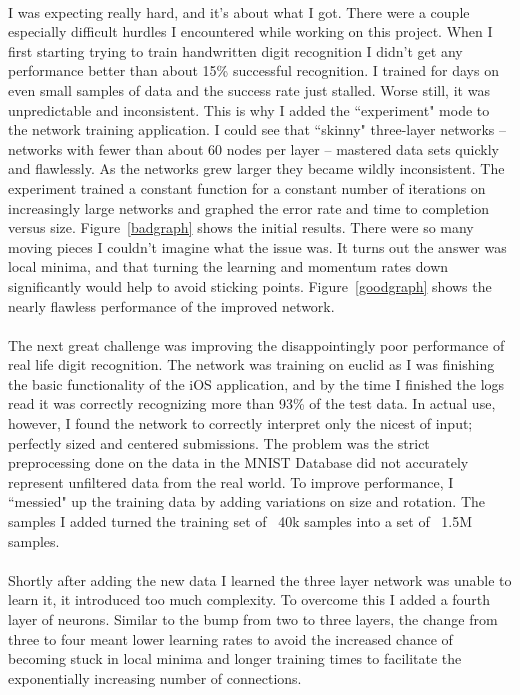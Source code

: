 \documentclass{article}
\begin{document}
    \paragraph{}I was expecting really hard, and it's about what I got. There were 
    a couple especially difficult hurdles I encountered while working on this 
    project. When I first starting trying to train handwritten digit recognition I 
    didn't get any performance better than about 15\% successful recognition. I 
    trained for days on even small samples of data and the success rate just 
    stalled. Worse still, it was unpredictable and inconsistent. This is why I 
    added the ``experiment" mode to the network training application. I could see 
    that ``skinny" three-layer networks -- networks with fewer than about 60 nodes 
    per layer -- mastered data sets quickly and flawlessly. As the networks grew 
    larger they became wildly inconsistent. The experiment trained a constant 
    function for a constant number of iterations on increasingly large networks and 
    graphed the error rate and time to completion versus size. Figure~\ref{badgraph}
    shows the initial results. There were so many moving pieces I couldn't imagine 
    what the issue was. It turns out the answer was local minima, and that turning the 
    learning and momentum rates down significantly would help to avoid sticking points.
    Figure~\ref{goodgraph} shows the nearly flawless performance of the improved 
    network.

    \paragraph{}The next great challenge was improving the disappointingly poor 
    performance of real life digit recognition. The network was training on euclid 
    as I was finishing the basic functionality of the iOS application, and by the 
    time I finished the logs read it was correctly recognizing more than 93\% of 
    the test data. In actual use, however, I found the network to correctly 
    interpret only the nicest of input; perfectly sized and centered submissions.
    The problem was the strict preprocessing done on the data in the MNIST Database
    did not accurately represent unfiltered data from the real world. To improve 
    performance, I ``messied" up the training data by adding variations on size 
    and rotation. The samples I added turned the training set of ~40k samples 
    into a set of ~1.5M samples. 

    \paragraph{}Shortly after adding the new data I learned the three layer 
    network was unable to learn it, it introduced too much complexity.
    To overcome this I added a fourth layer of neurons.
    Similar to the bump from two to three layers, the change from three to four 
    meant lower learning rates to avoid the increased chance of becoming stuck in 
    local minima and longer training times to facilitate the exponentially 
    increasing number of connections. 
    
\end{document}
